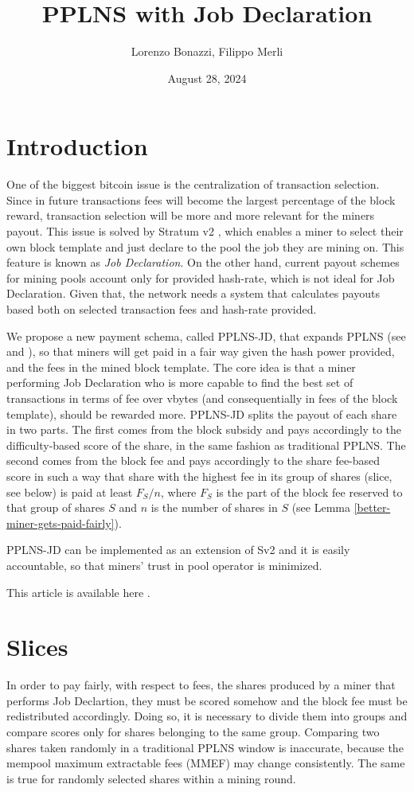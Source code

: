 \documentclass[10pt]{article}
\title{PPLNS with Job Declaration}
\author{Lorenzo Bonazzi, Filippo Merli}
\date{August 28, 2024} %
\begin{document}
\maketitle

\section{Introduction}
One of the biggest bitcoin issue is the centralization of transaction selection. Since in future transactions fees will become the largest percentage of the block reward, transaction selection will be more and more relevant for the miners payout. This issue is solved by Stratum v2 \cite{sv2}, which enables a miner to select their own block template and just declare to the pool the job they are mining on. This feature is known as \emph{Job Declaration}.  On the other hand, current payout schemes for mining pools account only for provided hash-rate, which is not ideal for Job Declaration.  Given that, the network needs a system that calculates payouts based both on selected transaction fees and hash-rate provided. 

We propose a new payment schema, called PPLNS-JD, that expands PPLNS (see \cite{rosenfeld} and \cite{ocean}), so that miners will get paid in a fair way given the hash power provided, and the fees in the mined block template. The core idea is that a miner performing Job Declaration who is more capable to find the best set of transactions in terms of fee over vbytes (and consequentially in fees of the block template), should be rewarded more. PPLNS-JD splits the payout of each share in two parts. The first comes from the block subsidy and pays accordingly to the difficulty-based score of the share, in the same fashion as traditional PPLNS. The second comes from the block fee and pays accordingly to the share fee-based score in such a way that share with the highest fee in its group of shares (slice, see below) is paid at least $F_S/n$, where $F_S$ is the part of the block fee reserved to that group of shares $S$ and $n$ is the number of shares in $S$ (see Lemma \ref{better-miner-gets-paid-fairly}). 

PPLNS-JD can be implemented as an extension of Sv2 \cite{extension} and it is easily accountable, so that miners' trust in pool operator is minimized. 

This article is available here \cite{article}.


\section{Slices}
In order to pay fairly, with respect to fees, the shares produced by a miner that performs Job Declartion, they must be scored somehow and the block fee must be redistributed accordingly. Doing so, it is necessary to divide them into groups and compare scores only for shares belonging to the same group. Comparing two shares taken randomly in a traditional PPLNS window is inaccurate, because the mempool maximum extractable fees (MMEF) may change consistently. The same is true for randomly selected shares within a mining round.
\end{document}
